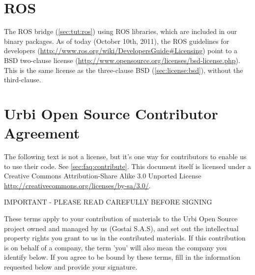 
\section{ROS}

The ROS bridge (\autoref{sec:tut:ros}) using ROS libraries, which are
included in our binary packages.  As of today (October 10th, 2011), the ROS
guidelines for developers
(\url{http://www.ros.org/wiki/DevelopersGuide\#Licensing}) point to a BSD
two-clause license
(\url{http://www.opensource.org/licenses/bsd-license.php}).  This is the
same license as the three-clause BSD (\autoref{sec:license:bsd}), without
the third-clause.


\clearpage
\section{Urbi Open Source Contributor Agreement}
\label{sec:license:uosca}

The following text is not a license, but it's one way for \usdk contributors
to enable us to use their code.  See \autoref{sec:faq:contribute}.  This
document itself is licensed under a Creative Commons Attribution-Share Alike
3.0 Unported License \url{http://creativecommons.org/licenses/by-sa/3.0/}.


\begin{center}
  IMPORTANT - PLEASE READ CAREFULLY BEFORE SIGNING
\end{center}

These terms apply to your contribution of materials to the Urbi Open Source
project owned and managed by us (Gostai S.A.S), and set out the intellectual
property rights you grant to us in the contributed materials. If this
contribution is on behalf of a company, the term 'you' will also mean the
company you identify below. If you agree to be bound by these terms, fill in
the information requested below and provide your signature.


